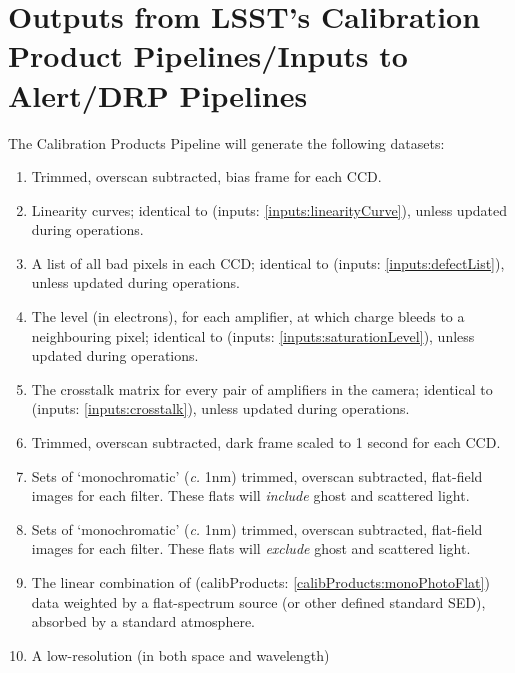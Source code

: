 \documentclass[12pt]{article}
\renewcommand{\c}{\textit{c.}\xspace}
\newcommand{\inputData}[1]{(inputs: \ref{inputs:#1})}
\newcommand{\outputData}[1]{(calibProducts: \ref{calibProducts:#1})}
\begin{document}

\section{Outputs from LSST's Calibration Product Pipelines/Inputs to Alert/DRP Pipelines}
\label{sec:calibrationOutputDatasets}

The Calibration Products Pipeline will generate the following datasets:
\begin{enumerate}[label=\textbf{\S}\arabic*,itemsep=5pt]
   \item\label{calibProducts:bias} Trimmed, overscan subtracted, bias frame for each CCD.
   \item\label{calibProducts:linearityCurve} Linearity curves;
     identical to \inputData{linearityCurve}, unless updated during operations.
   \item\label{calibProducts:defectList} A list of all bad pixels in each CCD;
     identical to \inputData{defectList}, unless updated during operations.     
   \item\label{calibProducts:saturationLevel} The level (in electrons), for each amplifier, at which charge
     bleeds to a neighbouring pixel;
     identical to \inputData{saturationLevel}, unless updated during operations.     
   \item\label{calibProducts:crosstalk}  The crosstalk matrix for every pair of amplifiers in the camera;
     identical to \inputData{crosstalk}, unless updated during operations.
   \item\label{calibProducts:dark} Trimmed, overscan subtracted, dark frame scaled to 1 second for each CCD.
   \item\label{calibProducts:monoFlat} Sets of `monochromatic' (\c 1nm) trimmed, overscan subtracted,
     flat-field images for each filter.  These flats will \textit{include} ghost and scattered light.
   \item\label{calibProducts:monoPhotoFlat} Sets of `monochromatic' (\c 1nm) trimmed, overscan subtracted,
     flat-field images for each filter.  These flats will \textit{exclude} ghost and scattered light.
   \item\label{calibProducts:standardPhotoFlat} The linear combination of \outputData{monoPhotoFlat}
     data weighted by a flat-spectrum source (or other defined standard SED), absorbed by a standard
     atmosphere.
   \item\label{calibProducts:monoPhotoFlatLowRes} A low-resolution (in both space and wavelength)

\end{enumerate}
\end{document}
